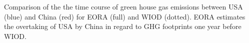 \label{fig:line} Comparison of the the time course of green house gas emissions between USA (blue) and China (red) for EORA (full) and WIOD (dotted). EORA estimates the overtaking of USA by China in regard to GHG footprints one year before WIOD.